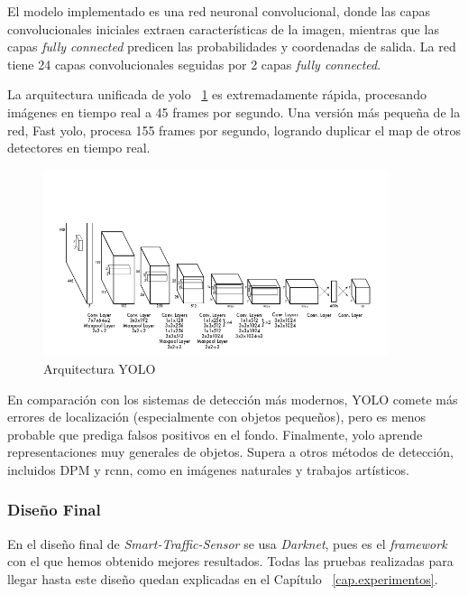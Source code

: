 El modelo implementado es una red neuronal convolucional, donde las capas convolucionales iniciales extraen características de la imagen, mientras que las capas \textit{fully connected} predicen las probabilidades y coordenadas de salida. La red tiene 24 capas convolucionales seguidas por 2 capas \textit{fully connected}. 

La arquitectura unificada de \acrshort{yolo} ~\ref{fig.yolov3} es extremadamente rápida, procesando imágenes en tiempo real a 45 frames por segundo. Una versión más pequeña de la red, Fast \acrshort{yolo}, procesa 155 frames por segundo, logrando duplicar el \acrfull{map} de otros detectores en tiempo real.

\begin{figure}[H] 
\begin{center}
	\includegraphics[width=0.9\textwidth]{figures/Diseno_global/yolov3.png}
   \caption{Arquitectura YOLO}
	\label{fig.yolov3}
\end{center}
\end{figure}

En comparación con los sistemas de detección más modernos, YOLO comete más errores de localización (especialmente con objetos pequeños), pero es menos probable que prediga falsos positivos en el fondo. Finalmente, \acrshort{yolo} aprende representaciones muy generales de objetos. Supera a otros métodos de detección, incluidos DPM y \acrshort{rcnn}, como en imágenes naturales y trabajos artísticos.

\subsubsection{Diseño Final}

En el diseño final de \textit{Smart-Traffic-Sensor} se usa \textit{Darknet}, pues es el \textit{framework} con el que hemos obtenido mejores resultados. Todas las pruebas realizadas para llegar hasta este diseño quedan explicadas en el Capítulo ~\ref{cap.experimentos}.

